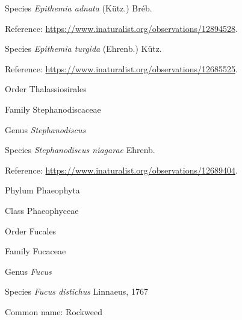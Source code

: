\documentclass[9pt, article]{memoir}
\begin{document}
\begin{multicols}{2}
\vspace{6pt}\noindent\hspace{36pt}Species \textit{Epithemia adnata} (Kütz.) Bréb.


Reference: 
\url{https://www.inaturalist.org/observations/12894528}.

\vspace{6pt}\noindent\hspace{36pt}Species \textit{Epithemia turgida} (Ehrenb.) Kütz.


Reference: 
\url{https://www.inaturalist.org/observations/12685525}.

\vspace{6pt}\noindent\hspace{18pt}Order Thalassiosirales


\vspace{6pt}\noindent\hspace{24pt}Family Stephanodiscaceae


\vspace{6pt}\noindent\hspace{30pt}Genus \textit{Stephanodiscus}


\vspace{6pt}\noindent\hspace{36pt}Species \textit{Stephanodiscus niagarae} Ehrenb.


Reference: 
\url{https://www.inaturalist.org/observations/12689404}.

\vspace{6pt}\noindent\hspace{6pt}Phylum Phaeophyta


\vspace{6pt}\noindent\hspace{12pt}Class Phaeophyceae


\vspace{6pt}\noindent\hspace{18pt}Order Fucales


\vspace{6pt}\noindent\hspace{24pt}Family Fucaceae


\vspace{6pt}\noindent\hspace{30pt}Genus \textit{Fucus}


\vspace{6pt}\noindent\hspace{36pt}Species \textit{Fucus distichus} Linnaeus, 1767


Common name: Rockweed


\end{multicols}
\end{document}
